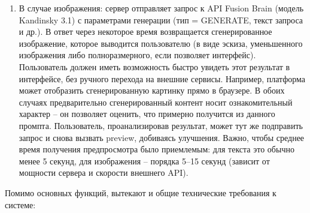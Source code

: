 \begin{enumerate}[label=\arabic*]
\begin{enumerate}[label=4.\arabic*]
        \item В случае изображения: сервер отправляет запрос к API Fusion Brain (модель Kandinsky 3.1) с параметрами генерации (тип = GENERATE, текст запроса и др.). В ответ через некоторое время возвращается сгенерированное изображение, которое выводится пользователю (в виде эскиза, уменьшенного изображения либо полноразмерного, если позволяет интерфейс). Пользователь должен иметь возможность быстро увидеть этот результат в интерфейсе, без ручного перехода на внешние сервисы. Например, платформа может отобразить сгенерированную картинку прямо в браузере. В обоих случаях предварительно сгенерированный контент носит ознакомительный характер – он позволяет оценить, что примерно получится из данного промпта. Пользователь, проанализировав результат, может тут же подправить запрос и снова вызвать preview, добиваясь улучшения. Важно, чтобы среднее время получения предпросмотра было приемлемым: для текста это обычно менее 5 секунд, для изображения – порядка 5–15 секунд (зависит от мощности сервера и скорости внешнего API).
    \end{enumerate}
\end{enumerate}
Помимо основных функций, вытекают и общие технические требования к системе: 
